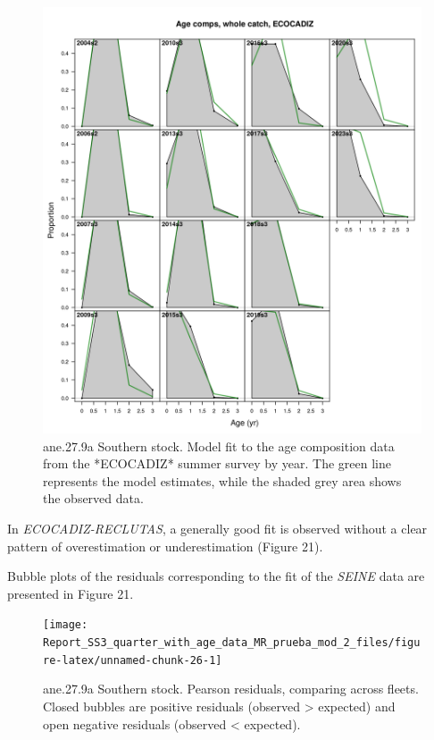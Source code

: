\documentclass[
]{article}
\begin{document}
\begin{figure}[H]

{\centering \includegraphics[width=0.95\linewidth]{report/run/S1.0_4FLEETS_SelECO_RecIndex_Mnewfix/fig_age_fit_Ecocadiz} 

}

\caption{ane.27.9a Southern stock. Model fit to the age composition data from the *ECOCADIZ* summer survey by year. The green line represents the model estimates, while the shaded grey area shows the observed data.}\label{fig:unnamed-chunk-24}
\end{figure}

In \emph{ECOCADIZ-RECLUTAS}, a generally good fit is observed without a
clear pattern of overestimation or underestimation (Figure 21).

Bubble plots of the residuals corresponding to the fit of the
\emph{SEINE} data are presented in Figure 21.

\begin{figure}[H]

{\centering \texttt{[image: Report\_SS3\_quarter\_with\_age\_data\_MR\_prueba\_mod\_2\_files/figure-latex/unnamed-chunk-26-1]} 

}

\caption{ane.27.9a Southern stock.  Pearson residuals, comparing across fleets. Closed bubbles are positive residuals (observed > expected) and open negative residuals (observed < expected).}\label{fig:unnamed-chunk-26}
\end{figure}
\end{document}
